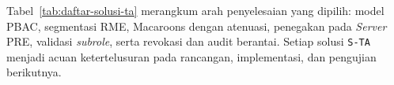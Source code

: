 Tabel~\ref{tab:daftar-solusi-ta} merangkum arah penyelesaian yang dipilih: model PBAC, segmentasi RME, Macaroons dengan atenuasi, penegakan pada \textit{Server} PRE, validasi \textit{subrole}, serta revokasi dan audit berantai. Setiap solusi \texttt{S-TA} menjadi acuan ketertelusuran pada rancangan, implementasi, dan pengujian berikutnya.


